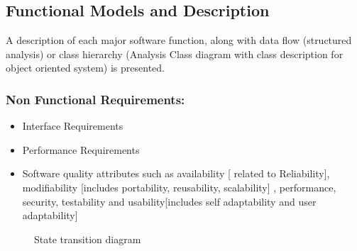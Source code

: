 \documentclass[12pt,a4paper]{article}
\begin{document}
 
 
\subsection{Functional Models and Description}  
A description of each major software function, along with data flow (structured analysis) or class hierarchy (Analysis Class diagram with class description for object oriented system) is presented. 


\subsubsection{Non Functional Requirements:}
\begin{itemize}
	\item	Interface Requirements
	\item	Performance Requirements
    \item	Software quality attributes such as availability [ related to Reliability], modifiability [includes portability, reusability, scalability] ,  		performance, security, testability and usability[includes self 			adaptability and user adaptability] 
\end{itemize} 


\begin{center}
	\begin{figure}[!htbp]
		\centering
	  \caption{State transition diagram}
	  \label{fig:state-dig}
	\end{figure}
\end{center} 
 
\end{document}
